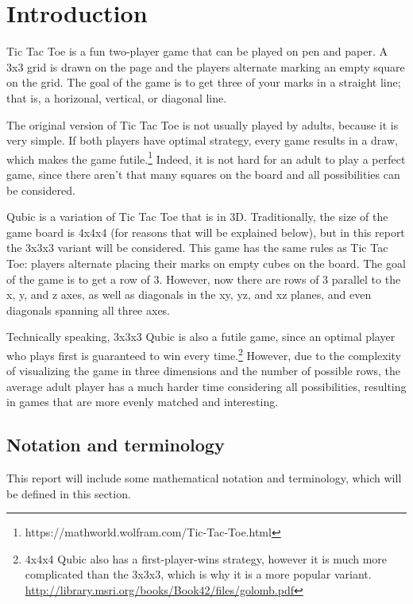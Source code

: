 \documentclass[11pt]{article}
\begin{document}

\section{Introduction}

Tic Tac Toe is a fun two-player game that can be played on pen and paper. A 3x3 grid is drawn on the page and the players alternate marking an empty square on the grid. The goal of the game is to get three of your marks in a straight line; that is, a horizonal, vertical, or diagonal line.

The original version of Tic Tac Toe is not usually played by adults, because it is very simple. If both players have optimal strategy, every game results in a draw, which makes the game futile.\footnote{https://mathworld.wolfram.com/Tic-Tac-Toe.html} Indeed, it is not hard for an adult to play a perfect game, since there aren't that many squares on the board and all possibilities can be considered.

Qubic is a variation of Tic Tac Toe that is in 3D. Traditionally, the size of the game board is 4x4x4 (for reasons that will be explained below), but in this report the 3x3x3 variant will be considered. This game has the same rules as Tic Tac Toe: players alternate placing their marks on empty cubes on the board. The goal of the game is to get a row of 3. However, now there are rows of 3 parallel to the x, y, and z axes, as well as diagonals in the xy, yz, and xz planes, and even diagonals spanning all three axes.

Technically speaking, 3x3x3 Qubic is also a futile game, since an optimal player who plays first is guaranteed to win every time.\footnote{4x4x4 Qubic also has a first-player-wins strategy, however it is much more complicated than the 3x3x3, which is why it is a more popular variant. \url{http://library.msri.org/books/Book42/files/golomb.pdf}} However, due to the complexity of visualizing the game in three dimensions and the number of possible rows, the average adult player has a much harder time considering all possibilities, resulting in games that are more evenly matched and interesting.

\subsection{Notation and terminology}
This report will include some mathematical notation and terminology, which will be defined in this section. 
\end{document}
